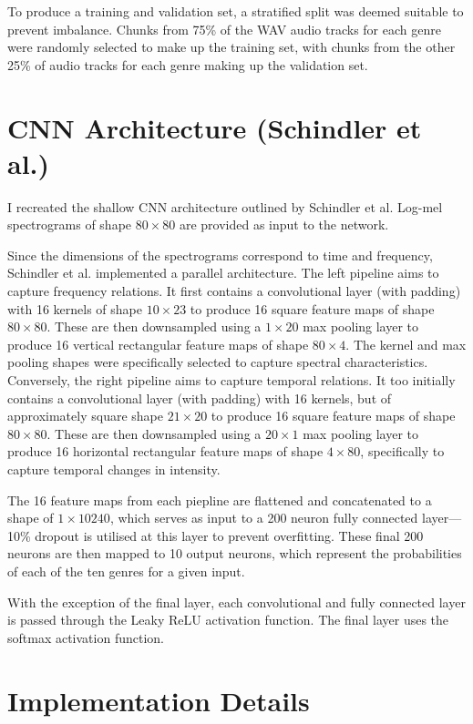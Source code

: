 \documentclass[conference]{IEEEtran}
\begin{document}
To produce a training and validation set, a stratified split was deemed suitable to prevent imbalance.
Chunks from 75\% of the WAV audio tracks for each genre were randomly selected to make up the training set, with chunks from the other 25\% of audio tracks for each genre making up the validation set.

\section{CNN Architecture (Schindler et al.)}

I recreated the shallow CNN architecture outlined by Schindler et al.
Log-mel spectrograms of shape $80\times80$ are provided as input to the network.

Since the dimensions of the spectrograms correspond to time and frequency, Schindler et al. implemented a parallel architecture.
The left pipeline aims to capture frequency relations.
It first contains a convolutional layer (with padding) with 16 kernels of shape $10\times23$ to produce 16 square feature maps of shape $80\times80$.
These are then downsampled using a $1\times20$ max pooling layer to produce 16 vertical rectangular feature maps of shape $80\times4$.
The kernel and max pooling shapes were specifically selected to capture spectral characteristics.
Conversely, the right pipeline aims to capture temporal relations.
It too initially contains a convolutional layer (with padding) with 16 kernels, but of approximately square shape $21\times20$ to produce 16 square feature maps of shape $80\times80$.
These are then downsampled using a $20\times1$ max pooling layer to produce 16 horizontal rectangular feature maps of shape $4\times80$, specifically to capture temporal changes in intensity.

The 16 feature maps from each piepline are flattened and concatenated to a shape of $1\times10240$, which serves as input to a 200 neuron fully connected layer---10\% dropout is utilised at this layer to prevent overfitting.
These final 200 neurons are then mapped to 10 output neurons, which represent the probabilities of each of the ten genres for a given input.

With the exception of the final layer, each convolutional and fully connected layer is passed through the Leaky ReLU activation function.
The final layer uses the softmax activation function.

\section{Implementation Details}
\end{document}
